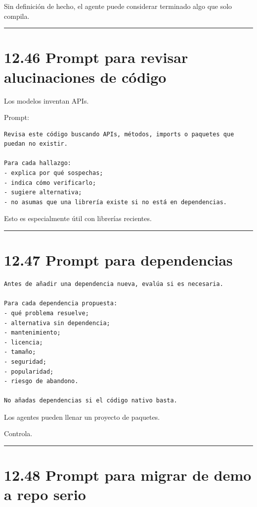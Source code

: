 Sin definición de hecho, el agente puede considerar terminado algo que
solo compila.

\begin{center}\rule{0.5\linewidth}{0.5pt}\end{center}

\section{12.46 Prompt para revisar alucinaciones de
código}\label{prompt-para-revisar-alucinaciones-de-cuxf3digo}

Los modelos inventan APIs.

Prompt:

\begin{lstlisting}
Revisa este código buscando APIs, métodos, imports o paquetes que puedan no existir.

Para cada hallazgo:
- explica por qué sospechas;
- indica cómo verificarlo;
- sugiere alternativa;
- no asumas que una librería existe si no está en dependencias.
\end{lstlisting}

Esto es especialmente útil con librerías recientes.

\begin{center}\rule{0.5\linewidth}{0.5pt}\end{center}

\section{12.47 Prompt para dependencias}\label{prompt-para-dependencias}

\begin{lstlisting}
Antes de añadir una dependencia nueva, evalúa si es necesaria.

Para cada dependencia propuesta:
- qué problema resuelve;
- alternativa sin dependencia;
- mantenimiento;
- licencia;
- tamaño;
- seguridad;
- popularidad;
- riesgo de abandono.

No añadas dependencias si el código nativo basta.
\end{lstlisting}

Los agentes pueden llenar un proyecto de paquetes.

Controla.

\begin{center}\rule{0.5\linewidth}{0.5pt}\end{center}

\section{12.48 Prompt para migrar de demo a repo
serio}\label{prompt-para-migrar-de-demo-a-repo-serio}

